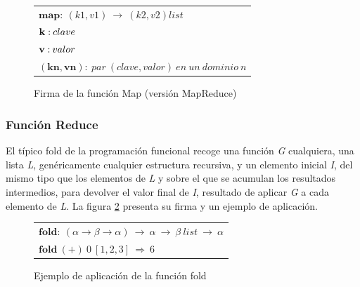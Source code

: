 \begin{figure}[tbp]
\begin{center}
\begin{tabular}{|l|}
\hline
$\mathbf{map:} \: \left( k1,v1 \right) \: \rightarrow \: \left( k2,v2 \right) list$ \\
$\mathbf{k:} \: clave \linebreak$ \\
$\mathbf{v:} \: valor \linebreak$ \\
$\mathbf{\left(kn,vn \right):} \: par \: \left( clave,valor \right) \: en \: un \: dominio \: n$ \\
\hline
\end{tabular}
\caption{Firma de la funci\'on Map (versi\'on MapReduce)}
\label{fig:mapreducemap}
\end{center}
\end{figure}


\subsubsection{Funci\'on Reduce}\label{reduce}
\noindent El t\'ipico fold de la programaci\'on funcional recoge una funci\'on \emph{G} cualquiera, una lista \emph{L}, gen\'ericamente cualquier estructura recursiva, y un elemento inicial \emph{I}, del mismo tipo que los elementos de \emph{L} y sobre el que se acumulan los resultados intermedios, para devolver el valor final de \emph{I}, resultado de aplicar \emph{G} a cada elemento de \emph{L}. La figura \ref{fig:fold} presenta su firma y un ejemplo de aplicaci\'on.\newline

\begin{figure}[tbp]
\begin{center}
\begin{tabular}{|l|}
\hline
$\mathbf{fold:} \: \left( \alpha \rightarrow \beta \rightarrow \alpha \right) \: \rightarrow \: \alpha \: \rightarrow \: \beta \: list \: \rightarrow \: \alpha$ \\
$\mathbf{fold} \: \left( \mathbf{+} \right) \: 0 \: \left[ 1,2,3 \right] \: \Rightarrow \: 6$ \\
\hline
\end{tabular}
\caption{Ejemplo de aplicaci\'on de la funci\'on fold}
\label{fig:fold}
\end{center}
\end{figure}

